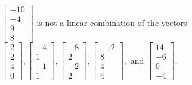 \begin{exercise}
\begin{exerciseStatement}
  \end{exerciseStatement}
  \begin{exerciseAnswer}
   \(\left[\begin{array}{c}
-10 \\
-4 \\
9 \\
8
\end{array}\right]\) 
  	 is not  
	a linear combination of the vectors \(\left[\begin{array}{c}
2 \\
2 \\
4 \\
0
\end{array}\right] , \left[\begin{array}{c}
-4 \\
1 \\
-1 \\
1
\end{array}\right] , \left[\begin{array}{c}
-8 \\
2 \\
-2 \\
2
\end{array}\right] , \left[\begin{array}{c}
-12 \\
8 \\
4 \\
4
\end{array}\right] , \text{ and } \left[\begin{array}{c}
14 \\
-6 \\
0 \\
-4
\end{array}\right]\).

	
  


  \end{exerciseAnswer}
\end{exercise}